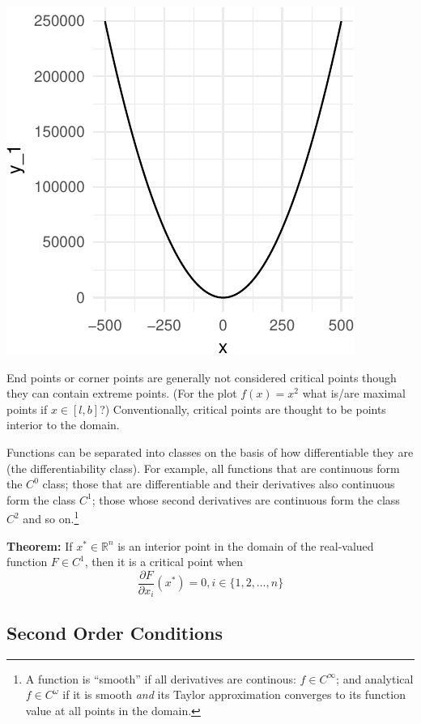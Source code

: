 \documentclass[11pt,]{article}
\let\rmarkdownfootnote\footnote%
\def\footnote{\protect\rmarkdownfootnote}
\begin{document}
\includegraphics{Optimization_files/figure-latex/FOC_dim_1-1.pdf}

End points or corner points are generally not considered critical points
though they can contain extreme points. (For the plot \(f(x)=x^2\) what
is/are maximal points if \(x\in [l, b]\)?) Conventionally, critical
points are thought to be points interior to the domain.

Functions can be separated into classes on the basis of how
differentiable they are (the differentiability class). For example, all
functions that are continuous form the \(C^0\) class; those that are
differentiable and their derivatives also continuous form the class
\(C^1\); those whose second derivatives are continuous form the class
\(C^2\) and so on.\footnote{A function is ``smooth'' if all derivatives
  are continous: \(f\in C^{\infty}\); and analytical
  \(f \in C^{\omega}\) if it is smooth \emph{and} its Taylor
  approximation converges to its function value at all points in the
  domain.}

\textbf{Theorem:} If \(x^*\in \mathbb{R}^n\) is an interior point in the
domain of the real-valued function \(F\in C^1\), then it is a critical
point when \[
  \frac{\partial F}{\partial x_i}(x^*) = 0, i\in \{1, 2,\hdots, n\}
\]

\subsection{Second Order Conditions}\label{second-order-conditions}
\end{document}
